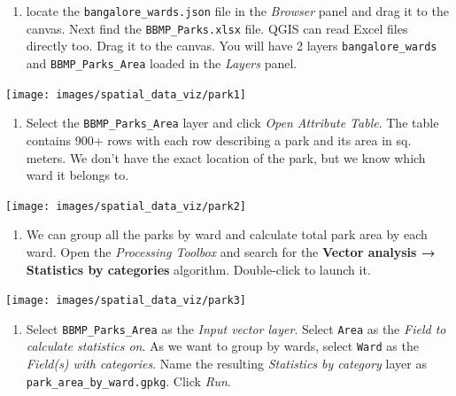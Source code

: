 \documentclass[
  12pt,
  a4paper]{article}
\providecommand{\tightlist}{%
  \setlength{\itemsep}{0pt}\setlength{\parskip}{0pt}}
\begin{document}
\begin{enumerate}
\def\labelenumi{\arabic{enumi}.}
\tightlist
\item
  locate the \texttt{bangalore\_wards.json} file in the \emph{Browser}
  panel and drag it to the canvas. Next find the
  \texttt{BBMP\_Parks.xlsx} file. QGIS can read Excel files directly
  too. Drag it to the canvas. You will have 2 layers
  \texttt{bangalore\_wards} and \texttt{BBMP\_Parks\_Area} loaded in the
  \emph{Layers} panel.
\end{enumerate}

\begin{center}\texttt{[image: images/spatial\_data\_viz/park1]} \end{center}

\begin{enumerate}
\def\labelenumi{\arabic{enumi}.}
\setcounter{enumi}{1}
\tightlist
\item
  Select the \texttt{BBMP\_Parks\_Area} layer and click \emph{Open
  Attribute Table}. The table contains 900+ rows with each row
  describing a park and its area in sq. meters. We don't have the exact
  location of the park, but we know which ward it belongs to.
\end{enumerate}

\begin{center}\texttt{[image: images/spatial\_data\_viz/park2]} \end{center}

\begin{enumerate}
\def\labelenumi{\arabic{enumi}.}
\setcounter{enumi}{2}
\tightlist
\item
  We can group all the parks by ward and calculate total park area by
  each ward. Open the \emph{Processing Toolbox} and search for the
  \textbf{Vector analysis → Statistics by categories} algorithm.
  Double-click to launch it.
\end{enumerate}

\begin{center}\texttt{[image: images/spatial\_data\_viz/park3]} \end{center}

\begin{enumerate}
\def\labelenumi{\arabic{enumi}.}
\setcounter{enumi}{3}
\tightlist
\item
  Select \texttt{BBMP\_Parks\_Area} as the \emph{Input vector layer}.
  Select \texttt{Area} as the \emph{Field to calculate statistics on}.
  As we want to group by wards, select \texttt{Ward} as the
  \emph{Field(s) with categories}. Name the resulting \emph{Statistics
  by category} layer as \texttt{park\_area\_by\_ward.gpkg}. Click
  \emph{Run}.
\end{enumerate}
\end{document}
